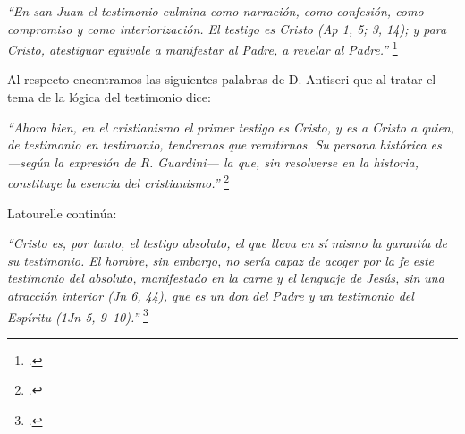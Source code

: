 \documentclass[11pt]{article}
\begin{document}
\emph{
``En san Juan el testimonio culmina como narración, como confesión, como compromiso y como interiorización. El testigo es Cristo (Ap 1, 5; 3, 14); y para Cristo, atestiguar equivale a manifestar al Padre, a revelar al Padre.''
}\footcite[1529]{dicctf}

Al respecto encontramos las siguientes palabras de D. Antiseri que al tratar el tema de la lógica del testimonio dice:

\emph{
``Ahora bien, en el cristianismo el primer testigo es Cristo, y es a Cristo a quien, de testimonio en testimonio, tendremos que remitirnos. Su persona histórica es ---según la expresión de R. Guardini--- la que, sin resolverse en la historia, constituye la esencia del cristianismo.''
}\footcite[168]{antiseri}

Latourelle continúa:

\emph{
``Cristo es, por tanto, el testigo absoluto, el que lleva en sí mismo la garantía de su testimonio. El hombre, sin embargo, no sería capaz de acoger por la fe este testimonio del absoluto, manifestado en la carne y el lenguaje de Jesús, sin una atracción interior (Jn 6, 44), que es un don del Padre y un testimonio del Espíritu (1Jn 5, 9--10).''
}\footcite[1530]{dicctf}
\end{document}
